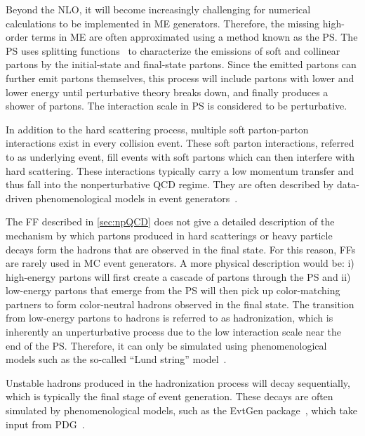 Beyond the \ac{NLO}, it will become increasingly challenging for numerical calculations to be implemented in \ac{ME} generators. Therefore, the missing high-order terms in \ac{ME} are often approximated using a method known as the \ac{PS}. The \ac{PS} uses splitting functions~\cite{Buckley:2011ms} to characterize the emissions of soft and collinear partons by the initial-state and final-state partons. Since the emitted partons can further emit partons themselves, this process will include partons with lower and lower energy until perturbative theory breaks down, and finally produces a shower of partons. The interaction scale in \ac{PS} is considered to be perturbative. 

In addition to the hard scattering process, multiple soft parton-parton interactions exist in every collision event. These soft parton interactions, referred to as underlying event, fill events with soft partons which can then interfere with hard scattering. These interactions typically carry a low momentum transfer and thus fall into the nonperturbative \ac{QCD} regime. They are often described by data-driven phenomenological models in event generators~\cite{Sjostrand:2014zea}.

The \ac{FF} described in \autoref{sec:npQCD} does not give a detailed description of the mechanism by which partons produced in hard scatterings or heavy particle decays form the hadrons that are observed in the final state. For this reason, \acp{FF} are rarely used in \ac{MC} event generators. A more physical description would be: i) high-energy partons will first create a cascade of partons through the \ac{PS} and ii) low-energy partons that emerge from the \ac{PS} will then pick up color-matching partners to form color-neutral hadrons observed in the final state. The transition from low-energy partons to hadrons is referred to as hadronization, which is inherently an unperturbative process due to the low interaction scale near the end of the \ac{PS}. Therefore, it can only be simulated using phenomenological models such as the so-called ``Lund string'' model~\cite{Andersson:1983ia}.

Unstable hadrons produced in the hadronization process will decay sequentially, which is typically the final stage of event generation. These decays are often simulated by phenomenological models, such as the EvtGen package~\cite{Lange:2001uf}, which take input from \ac{PDG}~\cite{ParticleDataGroup:2022pth}.